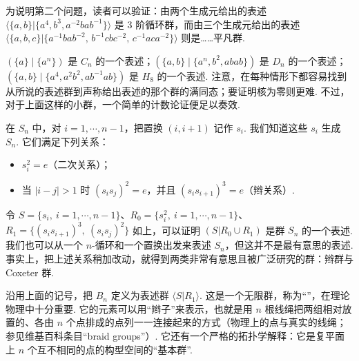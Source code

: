 为说明第二个问题，读者可以验证：由两个生成元给出的表述 $\langle\{a,b\}|\{a^4,b^3,a^{-2}bab^{-1}\}\rangle$ 是 $3$ 阶循环群，而由三个生成元给出的表述 $\langle\{a,b,c\}|\{a^{-1}bab^{-2},\,b^{-1}cbc^{-2},\,c^{-1}aca^{-2}\}\rangle$ 则是……平凡群.
\begin{numpara}[例]\label{np:fg-2-3-4}
$(\{a\}\mid\{a^n\})$ 是 $C_n$ 的一个表述；$(\{a,b\}\mid\{a^n,b^2,abab\})$ 是 $D_n$ 的一个表述；$(\{a,b\}\mid\{a^4,a^2b^2,ab^{-1}ab\})$ 是 $H_8$ 的一个表述. 注意，在每种情形下都容易找到从所说的表述群到声称给出表述的那个群的满同态；要证明核为零则更难. 不过，对于上面这样的小群，一个简单的计数论证便足以奏效.
\end{numpara}
\begin{numpara}[例：对称群]\label{np:fg-2-3-5}
在 $S_n$ 中，对 $i=1,\cdots,n-1$，把置换 $(i,i+1)$ 记作 $s_i$. 我们知道这些 $s_i$ 生成 $S_n$. 它们满足下列关系：
\begin{itemize}
\item $s_i^2=e$（二次关系）；
\item 当 $|i-j|>1$ 时 $(s_is_j)^2=e$，并且 $(s_is_{i+1})^3=e$（辫关系）.
\end{itemize}
令 $S=\{s_i,\ i=1,\cdots,n-1\}$、$R_0=\{s_i^2,\ i=1,\cdots,n-1\}$、$R_1=\{(s_is_{i+1})^3,\ (s_is_j)^2\}$ 如上，可以证明 $(S|R_0\cup R_1)$ 是群 $S_n$ 的一个表述. 我们也可以从一个 $n$-循环和一个置换出发来表述 $S_n$，但这并不是最有意思的表述. 事实上，把上述关系稍加改动，就得到两类非常有意思且被广泛研究的群：辫群与 Coxeter 群.
\end{numpara}
\begin{numpara}[辫群]\label{np:fg-2-3-6}
沿用上面的记号，把 $B_n$ 定义为表述群 $\langle S|R_1\rangle$. 这是一个无限群，称为``''，在理论物理中十分重要. 它的元素可以用``辫子''来表示，也就是用 $n$ 根线绳把两组相对放置的、各由 $n$ 个点排成的点列一一连接起来的方式（物理上的点与真实的线绳；参见维基百科条目``braid groups''）. 它还有一个严格的拓扑学解释：它是复平面上 $n$ 个互不相同的点的构型空间的``基本群''.
\end{numpara}
